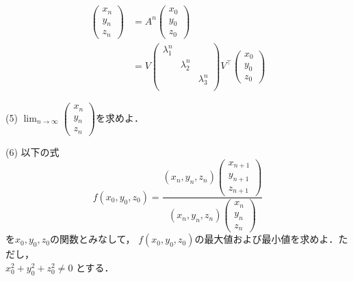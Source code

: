 \documentclass[a4j]{jarticle}
\let \ds \displaystyle
\begin{document}
\begin{align*}
 \begin{pmatrix}x_n\\y_n\\z_n\end{pmatrix} &= A^n \begin{pmatrix}x_0\\y_0\\z_0\end{pmatrix}\\
 &= V
 \begin{pmatrix}
  \lambda_1^n & & \\
  &\lambda_2^n & \\
  & & \lambda_3^n \\
 \end{pmatrix}V^\top \begin{pmatrix}x_0\\y_0\\z_0\end{pmatrix}
\end{align*}

\begin{screen}
 (5) $\ds \lim_{n\rightarrow\infty}\begin{pmatrix} x_n \\ y_n \\ z_n \end{pmatrix}$を求めよ．
\end{screen}

\begin{screen}
 (6) 以下の式
 $$f(x_0,y_0,z_0)=\frac{(x_n,y_n,z_n)\begin{pmatrix} x_{n+1} \\ y_{n+1} \\ z_{n+1} \end{pmatrix}}{(x_n,y_n,z_n)\begin{pmatrix} x_n \\ y_n \\ z_n \end{pmatrix}}$$
 を$x_0,y_0,z_0$の関数とみなして， $f(x_0,y_0,z_0)$の最大値および最小値を求めよ．ただし，\\ $x_0^2+y_0^2+z_0^2 \neq 0$ とする．
\end{screen}
\end{document}
